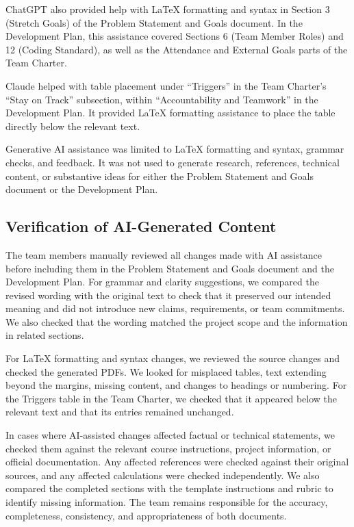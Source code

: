 \documentclass{article}
\begin{document}
ChatGPT also provided help with LaTeX formatting and syntax in Section 3 (Stretch Goals) of the Problem Statement and Goals document. In the Development Plan, this assistance covered Sections 6 (Team Member Roles) and 12 (Coding Standard), as well as the Attendance and External Goals parts of the Team Charter. 

Claude helped with table placement under ``Triggers'' in the Team Charter's ``Stay on Track'' subsection, within ``Accountability and Teamwork'' in the Development Plan. It provided LaTeX formatting assistance to place the table directly below the relevant text.

Generative AI assistance was limited to LaTeX formatting and syntax, grammar checks, and feedback. It was not used to generate research, references, technical content, or substantive ideas for either the Problem Statement and Goals document or the Development Plan. 

\subsection{Verification of AI-Generated Content}

The team members manually reviewed all changes made with AI assistance before including them in the Problem Statement and Goals document and the Development Plan. For grammar and clarity suggestions, we compared the revised wording with the original text to check that it preserved our intended meaning and did not introduce new claims, requirements, or team commitments. We also checked that the wording matched the project scope and the information in related sections. 

For LaTeX formatting and syntax changes, we reviewed the source changes and checked the generated PDFs. We looked for misplaced tables, text extending beyond the margins, missing content, and changes to headings or numbering. For the Triggers table in the Team Charter, we checked that it appeared below the relevant text and that its entries remained unchanged.  

In cases where AI-assisted changes affected factual or technical statements, we checked them against the relevant course instructions, project information, or official documentation. Any affected references were checked against their original sources, and any affected calculations were checked independently. We also compared the completed sections with the template instructions and rubric to identify missing information. The team remains responsible for the accuracy, completeness, consistency, and appropriateness of both documents. 
\end{document}
